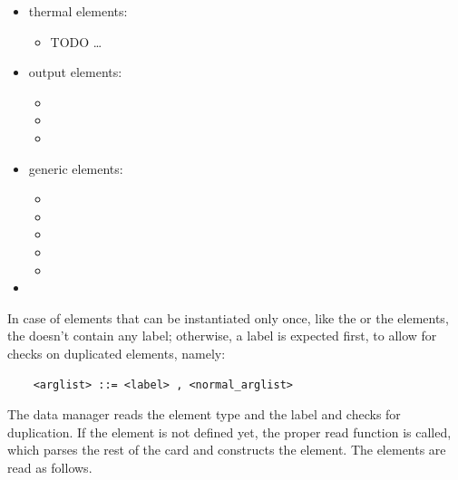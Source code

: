 \begin{itemize}
\item thermal elements:
\begin{itemize}
\item TODO \ldots
\end{itemize}

\item output elements:
\begin{itemize}
\item {}
\item {}
\item {}
\end{itemize}

\item generic elements:
\begin{itemize}
\item {}
\item {}
\item {}
\item {}
\item {}
\end{itemize}

\item {}
\end{itemize}


In case of elements that can be instantiated only once, like
the  or the  elements, the 
doesn't contain any label; otherwise, a label is expected first, to allow 
for checks on duplicated elements, namely: 
\begin{verbatim}
    <arglist> ::= <label> , <normal_arglist>
\end{verbatim}
The data manager reads the element type and the label and checks for
duplication. If the element is not defined yet, the proper read function is
called, which parses the rest of the card and constructs the element.
The elements are read as follows.



